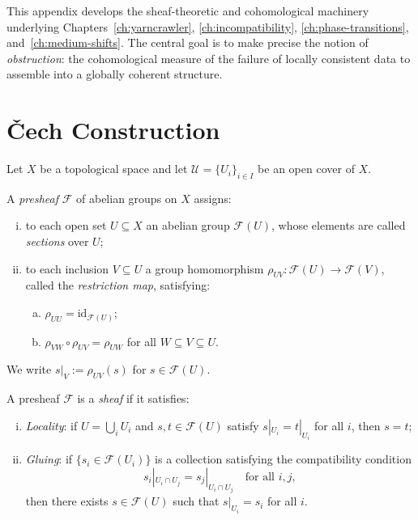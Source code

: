 \documentclass[11pt,openany]{book}
\begin{document}
This appendix develops the sheaf-theoretic and cohomological
machinery underlying Chapters~\ref{ch:yarncrawler},
\ref{ch:incompatibility}, \ref{ch:phase-transitions},
and~\ref{ch:medium-shifts}.  The central goal is to make
precise the notion of \emph{obstruction}: the cohomological
measure of the failure of locally consistent data to assemble
into a globally coherent structure.

\section{Čech Construction}
\label{sec:cech-construction}

Let $X$ be a topological space and let $\mathcal{U} =
\{U_i\}_{i \in I}$ be an open cover of $X$.

\begin{definition}[Presheaf]
A \emph{presheaf} $\mathcal{F}$ of abelian groups on $X$
assigns:
\begin{enumerate}[(i)]
  \item to each open set $U \subseteq X$ an abelian group
    $\mathcal{F}(U)$, whose elements are called
    \emph{sections} over $U$;
  \item to each inclusion $V \subseteq U$ a group
    homomorphism $\rho_{UV} : \mathcal{F}(U) \to
    \mathcal{F}(V)$, called the \emph{restriction map},
    satisfying:
    \begin{enumerate}[(a)]
      \item $\rho_{UU} = \mathrm{id}_{\mathcal{F}(U)}$;
      \item $\rho_{VW} \circ \rho_{UV} = \rho_{UW}$ for all
        $W \subseteq V \subseteq U$.
    \end{enumerate}
\end{enumerate}
We write $s|_V := \rho_{UV}(s)$ for $s \in \mathcal{F}(U)$.
\end{definition}

\begin{definition}[Sheaf]
\label{def:sheaf-app}
A presheaf $\mathcal{F}$ is a \emph{sheaf} if it satisfies:
\begin{enumerate}[(i)]
  \item \emph{Locality}: if $U = \bigcup_i U_i$ and $s, t
    \in \mathcal{F}(U)$ satisfy $s|_{U_i} = t|_{U_i}$ for
    all $i$, then $s = t$;
  \item \emph{Gluing}: if $\{s_i \in \mathcal{F}(U_i)\}$
    is a collection satisfying the compatibility condition
    \[
      s_i|_{U_i \cap U_j} = s_j|_{U_i \cap U_j}
      \quad \text{for all } i,j,
    \]
    then there exists $s \in \mathcal{F}(U)$ such that
    $s|_{U_i} = s_i$ for all $i$.
\end{enumerate}
\end{definition}
\end{document}
